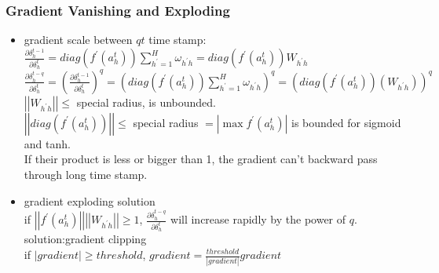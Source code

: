 \begin{frame}
\frametitle{Gradient Vanishing and Exploding}
	\small
	\begin{itemize}
		\item gradient scale between $qt$ time stamp: 
			\\$\frac{\partial{\delta_h^{t-1}}}{\partial{\delta_h^t}}
				=diag(f^\prime(a_h^t))\sum_{h^{\prime}=1}^{H}\omega_{h^{\prime}h}
				=diag(f^\prime(a_h^t))W_{h^{\prime}h}$
			\\$\frac{\partial{\delta_h^{t-q}}}{\partial{\delta_h^t}}
				=(\frac{\partial{\delta_h^{t-1}}}{\partial{\delta_h^t}})^q
				=(diag(f^\prime(a_h^t))
				\sum_{h^{\prime}=1}^{H}\omega_{h^{\prime}h})^q
				=(diag(f^\prime(a_h^t))(W_{h^{\prime}h}))^q$
			\\$\left|\left|W_{h^{\prime}h}\right|\right|\leq$ special radius, is unbounded.
			\\$\left|\left|diag(f^\prime(a_h^t))\right|\right|\leq$ special radius $= \left|\max f^\prime(a_h^t)\right|$ is bounded for sigmoid and tanh.
			\\\hspace{0.5cm}If their product is less or bigger than 1, the gradient can't backward pass through long time stamp.
		\item gradient exploding solution
			\\if $\left|\left|f^\prime(a_h^t)\right|\right|\left|\left|W_{h^{\prime}h}\right|\right| \geq 1$, 
				$\frac{\partial{\delta_h^{t-q}}}{\partial{\delta_h^t}}$ will increase rapidly by the power of $q$.
			\\solution:gradient clipping
			\\\hspace{0.5cm}if $\left|gradient\right|\geq threshold$, $gradient=\frac{threshold}{\left|gradient\right|}gradient$
	\end{itemize}
\end{frame}
